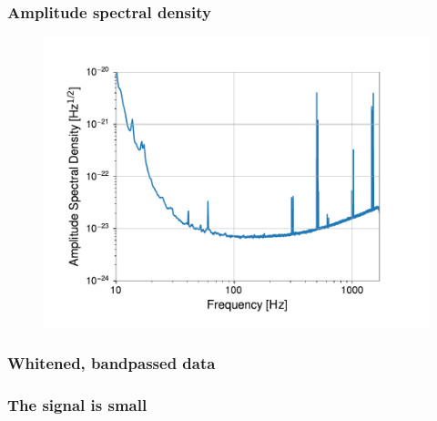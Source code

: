 \documentclass{beamer}
\begin{document}
\begin{frame}
    \frametitle{Amplitude spectral density}
    \vspace{-.2cm}
    \begin{figure}[ht]
    \includegraphics[width=.93\textwidth]{figures/asd}
    \label{fig:asd}
    \end{figure}
\end{frame}

\begin{frame}
    \frametitle{Whitened, bandpassed data}
    \begin{figure}[ht]
    \label{fig:whitened}
    \end{figure}
\end{frame}

\begin{frame}
    \frametitle{The signal is small}
    \begin{figure}[ht]    
    \label{fig:true_signal}
    \end{figure}
\end{frame}
\end{document}
